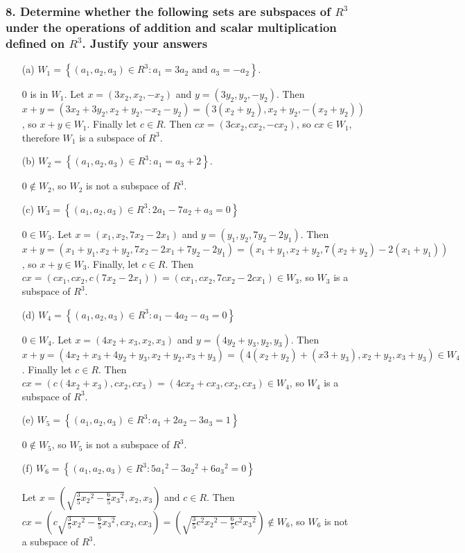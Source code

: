 \documentclass{article}
\begin{document}
\subsubsection*{8. Determine whether the following sets are subspaces of $R^3$ under the operations of addition and scalar multiplication defined on $R^3$. Justify your answers}
\begin{enumerate}
	\item[(a)] $W_1 = \left\{(a_1, a_2, a_3) \in R^3: a_1 = 3a_2\text{ and }a_3 = -a_2\right\}$.
	
	$0$ is in $W_1$. Let $x = (3x_2, x_2, -x_2)$ and $y = (3y_2, y_2, -y_2)$. Then $x + y = (3x_2 + 3y_2, x_2 + y_2, -x_2 - y_2) = (3(x_2 + y_2), x_2 + y_2, -(x_2 + y_2))$, so $x + y \in W_1$. Finally let $c \in R$. Then $cx = (3cx_2, cx_2, -cx_2)$, so $cx \in W_1$, therefore $W_1$ is a subspace of $R^3$.
	\item[(b)] $W_2 = \left\{(a_1, a_2, a_3) \in R^3: a_1 = a_3 + 2\right\}$.
	
	$0 \notin W_2$, so $W_2$ is not a subspace of $R^3$.
	\item[(c)] $W_3 = \left\{(a_1, a_2, a_3) \in R^3: 2a_1 - 7a_2 + a_3 = 0\right\}$
	
	$0 \in W_3$. Let $x = (x_1, x_2, 7x_2 - 2x_1)$ and $y = (y_1, y_2, 7y_2 - 2y_1)$. Then $x + y = (x_1 + y_1, x_2 + y_2, 7x_2 - 2x_1 + 7y_2 - 2y_1) = (x_1 + y_1, x_2 + y_2, 7(x_2 + y_2) - 2(x_1 + y_1))$, so $x + y \in W_3$. Finally, let $c \in R$. Then $cx = (cx_1, cx_2, c(7x_2 - 2x_1)) = (cx_1, cx_2, 7cx_2 - 2cx_1) \in W_3$, so $W_3$ is a subspace of $R^3$.
	\item[(d)] $W_4 = \left\{(a_1, a_2, a_3) \in R^3: a_1 - 4a_2 - a_3 = 0\right\}$
	
	$0 \in W_4$. Let $x = (4x_2 + x_3, x_2, x_3)$ and $y = (4y_2 + y_3, y_2, y_3)$. Then $x + y = (4x_2 + x_3 + 4y_2 + y_3, x_2 + y_2, x_3 + y_3) = (4(x_2 + y_2) + (x3 + y_3), x_2 + y_2, x_3 + y_3) \in W_4$. Finally let $c \in R$. Then $cx = (c(4x_2 + x_3), cx_2, cx_3) = (4cx_2 + cx_3, cx_2, cx_3) \in W_4$, so $W_4$ is a subspace of $R^3$.
	\item[(e)] $W_5 = \left\{(a_1, a_2, a_3) \in R^3: a_1 + 2a_2 - 3a_3 = 1\right\}$
	
	$0 \notin W_5$, so $W_5$ is not a subspace of $R^3$.
	\item[(f)] $W_6 = \left\{(a_1, a_2, a_3) \in R^3:5{a_1}^2 - 3{a_2}^2 + 6{a_3}^2 = 0\right\}$
	
	Let $x = \left(\sqrt{\frac{3}{5}{x_2}^2 - \frac{6}{5}{x_3}^2}, x_2, x_3\right)$ and $c \in R$. Then $cx = \left(c\sqrt{\frac{3}{5}{x_2}^2 - \frac{6}{5}{x_3}^2}, cx_2, cx_3\right) = (\sqrt{\frac{3}{5}c^2{x_2}^2 - \frac{6}{5}c^2{x_3}^2}) \notin W_6$, so $W_6$ is not a subspace of $R^3$.
\end{enumerate}
\end{document}
